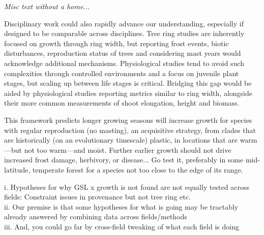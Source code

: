 \documentclass[11pt]{article}
\begin{document}
\emph{Misc text without a home...}

Disciplinary work could also rapidly advance our understanding, especially if designed to be comparable across disciplines. Tree ring studies are inherently focused on growth through ring width, but reporting frost events, biotic disturbances, reproduction status of trees and considering mast years would acknowledge additional mechanisms. Physiological studies tend to avoid such complexities through controlled environments and a focus on juvenile plant stages, but scaling up between life stages is critical. Bridging this gap would be aided by physiological studies reporting metrics similar to ring width, alongside their more common measurements of shoot elongation, height and biomass. 

This framework predicts longer growing seasons will increase growth for species with regular reproduction (no masting), an acquisitive strategy, from clades that are historically (on an evolutionary timescale) plastic, in locations that are warm---but not too warm---and moist. Further earlier growth should not drive increased frost damage, herbivory, or disease... Go test it, preferably in some mid-latitude, temperate forest for a species not too close to the edge of its range.


i. Hypotheses for why GSL x growth is not found are not equally tested across fields: Constraint issues in provenance but not tree ring etc.\\
ii. Our premise is that some hypotheses for what is going may be tractably already answered by combining data across fields/methods\\
iii. And, you could go far by cross-field tweaking of what each field is doing

\end{document}
